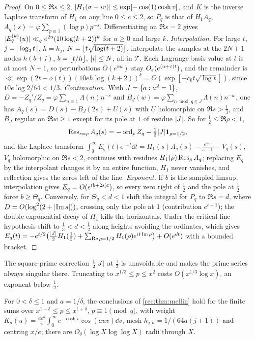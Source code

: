 \begin{proof}
On $0\le\Re s\le2$, $\lvert H_1(\sigma+iv)\rvert\le\exp[-\cos(1)\cosh v]$, and $K$ is the inverse Laplace transform of
$H_1$ on any line $0\le c\le2$, so $P_q$ is that of $H_1A_q$, $A_q(s)=\varphi\sum_{p\equiv1}(\log p)p^{-s}$. Differentiating
on $\Re s=2$ gives $\lvert E_q^{(k)}(u)\rvert\ll_qe^{2u}(10\log(k+2))^k$ for $u\ge0$ and large $k$. \emph{Interpolation.}
For large $t$, $j=\lfloor\log_2t\rfloor$, $h=h_j$, $N=\lfloor t\sqrt{\log(t+2)}\rfloor$, interpolate the samples at the $2N+1$
nodes $h(b+i)$, $b=\lfloor t/h\rfloor$, $\lvert i\rvert\le N$, all in $\mathcal T$. Each Lagrange basis value at $t$ is at most
$N+1$, so perturbations $O(e^{\alpha u})$ stay $O_\varepsilon(e^{(\alpha+\varepsilon)t})$, and the remainder is
$\ll\exp(2t+o(t))(10eh\log(k+2))^k=O(\exp[-c_0t\sqrt{\log t}])$, since $10e\log2/64<1/3$. \emph{Continuation.}
With $J=\{a:a^2=1\}$, $D=-Z_q'/Z_q=\varphi\sum_{n\equiv1}\Lambda(n)n^{-s}$ and
$B_J(w)=\varphi\sum_{n\bmod q\in J}\Lambda(n)n^{-w}$, one has $A_q(s)=D(s)-B_J(2s)+U(s)$ with $U$ holomorphic on $\Re s>\tfrac13$,
and $B_J$ regular on $\Re w\ge1$ except for its pole at $1$ of residue $\lvert J\rvert$. So for $\tfrac12\le\Re\rho<1$,
\[
 \operatorname{Res}_{s=\rho}A_q(s)=-\operatorname{ord}_\rho Z_q-\tfrac12\lvert J\rvert\mathbf 1_{\rho=1/2},
\]
and the Laplace transform $\int_0^\infty E_q(t)e^{-st}\dd t=H_1(s)A_q(s)-\frac{e^{-1}}{s-1}-V_q(s)$, $V_q$ holomorphic on
$\Re s<2$, continues with residues $H_1(\rho)\operatorname{Res}_\rho A_q$; replacing $E_q$ by the interpolant changes it by an
entire function, $H_1$ never vanishes, and reflection gives the zeros left of the line.
\emph{Exponent.} If $b$ is the sampled limsup, interpolation gives $E_q=O(e^{(b+2\varepsilon)t})$, so every zero
right of $\tfrac12$ and the pole at $\tfrac12$ force $b\ge\Theta_q$. Conversely, for $\Theta_q<d<1$ shift the integral
for $P_q$ to $\Re s=d$, where $D=O(\log^2(2+\lvert\operatorname{Im} s\rvert))$, crossing only the pole at $1$ (contribution $e^{t-1}$);
the double-exponential decay of $H_1$ kills the horizontals. Under the critical-line hypothesis shift
to $\tfrac13<d<\tfrac12$ along heights avoiding the ordinates, which gives
$E_q(t)=-e^{t/2}\bigl(\tfrac{\lvert J\rvert}2H_1(\tfrac12)+\sum_{\operatorname{Re}\rho=1/2}H_1(\rho)e^{it\operatorname{Im}\rho}\bigr)+O(e^{dt})$ with a bounded bracket.
\end{proof}

The square-prime correction $\tfrac12\lvert J\rvert$ at $\tfrac12$ is unavoidable and makes the prime series always
singular there. Truncating to $x^{1/3}\le p\le x^2$ costs $O(x^{1/3}\log x)$, an exponent below $\tfrac12$.

\begin{corollary}\label{rec:cor:mellinwindow}
For $0<\delta\le1$ and $a=1/\delta$, the conclusions of \cref{rec:thm:mellin} hold for the finite sums over
$x^{1-\delta}\le p\le x^{1+\delta}$, $p\equiv1\pmod q$, with weight $K_a(u)=\frac{ae^u}\pi\int_0^\infty e^{-\cosh v}\cos(auv)\dd v$, mesh
$h_{j,a}=1/(64a(j+1))$ and centring $x/e$; there are $O_\delta(\log X\log\log X)$ radii through $X$.
\end{corollary}

